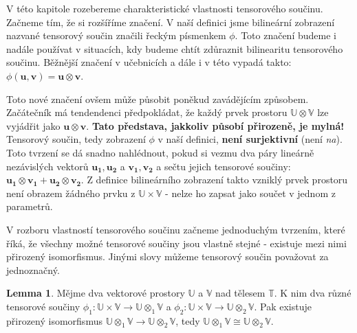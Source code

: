 \documentclass[a5paper,12pt]{amsbook}
\theoremstyle{definition}
\newtheorem{lemma}[theorem]{Lemma}
\newcommand{\myvec}[1]{\bm{#1}}
\newcommand{\myspace}[1]{\mathbb{#1}}
\begin{document}
\noindent
V této kapitole rozebereme charakteristické vlastnosti tensorového součinu. Začneme tím, že si rozšíříme
značení. V naší definici jsme bilineární zobrazení nazvané tensorový součin značili řeckým písmenkem
$\phi$. Toto značení budeme i nadále používat v situacích, kdy budeme chtít zdůraznit bilinearitu
tensorového součinu. Běžnější značení v učebnicích a dále i v této vypadá takto: $\phi(\myvec{u}, \myvec{v}) = \myvec{u}\otimes\myvec{v}$.

Toto nové značení ovšem může působit poněkud zavádějícím způsobem. Začátečník má tendendenci předpokládat,
že každý prvek prostoru $\myspace{U}\otimes\myspace{V}$ lze vyjádřit jako $\myvec{u}\otimes\myvec{v}$.
\textbf{Tato představa, jakkoliv působí přirozeně, je mylná!} Tensorový součin, tedy zobrazení $\phi$
v naší definici, \textbf{není surjektivní} (není \textit{na}). Toto tvrzení se dá snadno nahlédnout,
pokud si vezmu dva páry lineárně nezávislých vektorů $\myvec{u_1}, \myvec{u_2}$ a $\myvec{v_1}, \myvec{v_2}$
a sečtu jejich tensorové součiny: $\myvec{u_1}\otimes\myvec{v_1} + \myvec{u_2}\otimes\myvec{v_2}$.
Z definice bilineárního zobrazení takto vzniklý prvek prostoru není obrazem žádného prvku z
$\myspace{U}\times\myspace{V}$ - nelze ho zapsat jako součet v jednom z parametrů.

\medskip\noindent
V rozboru vlastností tensorového součinu začneme jednoduchým tvrzením, které říká, že všechny možné
tensorové součiny jsou vlastně stejné - existuje mezi nimi přirozený isomorfismus. Jinými slovy
můžeme tensorový součin považovat za jednoznačný.

\begin{lemma}
Mějme dva vektorové prostory $\myspace{U}$ a $\myspace{V}$ nad tělesem $\myspace{T}$. K nim dva
různé tensorové součiny $\phi_1: \myspace{U}\times\myspace{V}\rightarrow\myspace{U}\otimes_1\myspace{V}$
a $\phi_2: \myspace{U}\times\myspace{V}\rightarrow\myspace{U}\otimes_2\myspace{V}$. Pak existuje
přirozený isomorfismus $\myspace{U}\otimes_1\myspace{V}\rightarrow\myspace{U}\otimes_2\myspace{V}$,
tedy $\myspace{U}\otimes_1\myspace{V}\cong\myspace{U}\otimes_2\myspace{V}$.
\end{lemma}
\end{document}

